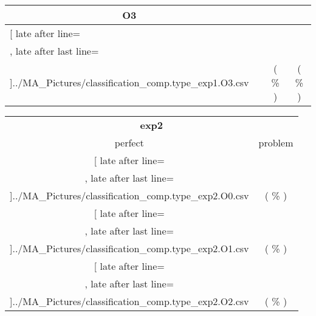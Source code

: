 \begin{table}[!htbp]
{\begin{tabular}{l|c|c|c}
\multicolumn{1}{c}{\bfseries O3}
	\\\midrule
	\csvreader[ late after line=\\, late after last line=\\\bottomrule]{../MA_Pictures/classification_comp.type_exp1.O3.csv}{
}
	{\csvcolii  &  \csvcoliii & \csvcoliv ( \csvcolv \% ) & \csvcolvi( \csvcolvii\% )}%


    	\end{tabular}

	\begin{tabular}{|c|c}%

	\toprule
    \multicolumn{2}{c}{\bfseries exp2}\\
	
	     perfect &  problem %
	\\\midrule
	\csvreader[ late after line=\\, late after last line=\\\midrule]{../MA_Pictures/classification_comp.type_exp2.O0.csv}{
}
	{\csvcoliv ( \csvcolv \% ) & \csvcolvi( \csvcolvii\% )}%
\multicolumn{1}{c}{}

	\\\midrule
	\csvreader[ late after line=\\, late after last line=\\\midrule]{../MA_Pictures/classification_comp.type_exp2.O1.csv}{
}
	{\csvcoliv ( \csvcolv \% ) & \csvcolvi( \csvcolvii\% )}%
	
	\multicolumn{1}{c}{}

	\\\midrule
	\csvreader[ late after line=\\, late after last line=\\\midrule]{../MA_Pictures/classification_comp.type_exp2.O2.csv}{
}
	{\csvcoliv ( \csvcolv \% ) & \csvcolvi( \csvcolvii\% )}%
	

\end{tabular}}
\end{table}

